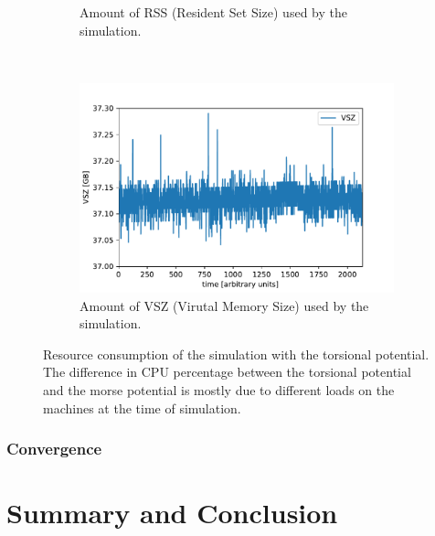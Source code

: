 \documentclass{article}
\begin{document}
\begin{figure}[H]
\begin{subfigure}[b]{0.5 \textwidth}
    \caption{Amount of RSS (Resident Set Size) used by the simulation.}
  \end{subfigure}
  ~
  \begin{subfigure}[b]{0.5 \textwidth}
    \includegraphics[width = \textwidth]{../parser/cospot_VSZ.pdf}
    \caption{Amount of VSZ (Virutal Memory Size) used by the simulation.}
  \end{subfigure}
  \caption{Resource consumption of the simulation with the torsional potential. The difference in CPU percentage between the torsional potential and the morse potential is mostly due to different loads on the machines at the time of simulation.}
  \label{fig:cos_resource}
\end{figure}


\subsubsection{Convergence}



\section{Summary and Conclusion}
\end{document}
